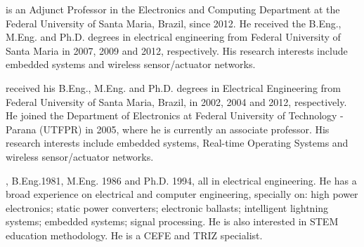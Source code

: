 \documentclass[final,authoryear,3p,twocolumn]{elsarticle}
\begin{document}





\newpage

 is an Adjunct Professor in the Electronics and Computing Department at the Federal University of Santa Maria, Brazil, since 2012. He received the B.Eng., M.Eng. and Ph.D. degrees in electrical engineering from Federal University of Santa Maria in 2007, 2009 and 2012, respectively. His research interests include embedded systems and wireless sensor/actuator networks.\newline

received his B.Eng., M.Eng. and Ph.D. degrees in Electrical Engineering from Federal University of Santa Maria, Brazil, in 2002, 2004 and 2012, respectively. He joined the Department of Electronics at Federal University of Technology - Parana (UTFPR) in 2005, where he is currently an associate professor. His research interests include embedded systems, Real-time Operating Systems and wireless sensor/actuator networks.\newline

, B.Eng.1981, M.Eng. 1986 and Ph.D. 1994, all in electrical engineering. He has a broad experience on electrical and computer engineering, specially on: high power electronics; static power converters; electronic ballasts; intelligent lightning systems; embedded systems; signal processing. He is also interested in STEM education methodology. He is a CEFE and TRIZ specialist.
\end{document}
